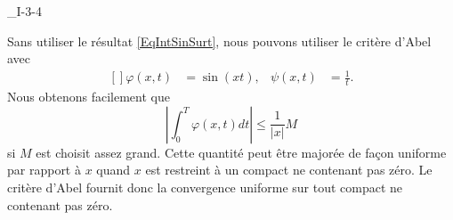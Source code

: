 \begin{corrige}{_I-3-4}
\begin{enumerate}
Sans utiliser le résultat \eqref{EqIntSinSurt}, nous pouvons utiliser le critère d'Abel avec
\begin{equation}
	\begin{aligned}[]
		\varphi(x,t)	&=\sin(xt),	&	\psi(x,t)	&=\frac{1}{ t }.
	\end{aligned}
\end{equation}
Nous obtenons facilement que
\begin{equation}
	|\int_0^T\varphi(x,t)dt |\leq\frac{1}{ | x | }M
\end{equation}
si $M$ est choisit assez grand. Cette quantité peut être majorée de façon uniforme par rapport à $x$ quand $x$ est restreint à un compact ne contenant pas zéro. Le critère d'Abel fournit donc la convergence uniforme sur tout compact ne contenant pas zéro.

\end{enumerate}

\end{corrige}
